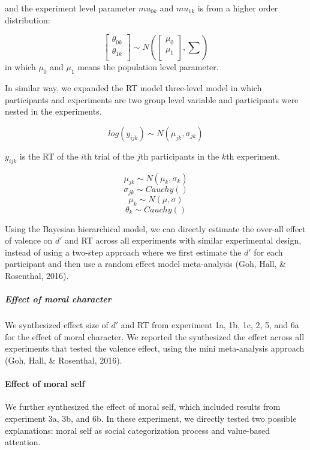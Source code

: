 \documentclass[
  english,
  man]{apa6}
\let\oldparagraph\paragraph
\renewcommand{\paragraph}[1]{\oldparagraph{#1}\mbox{}}
\let\oldsubparagraph\subparagraph
\renewcommand{\subparagraph}[1]{\oldsubparagraph{#1}\mbox{}}
\begin{document}
and the experiment level parameter \(mu_{0k}\) and \(mu_{1k}\) is from a higher order distribution:

\[\begin{bmatrix}\theta_{0k}\\
\theta_{1k}\\
\end{bmatrix} \sim N(\begin{bmatrix}\mu_{0}\\
\mu_{1}\\
\end{bmatrix}, \sum)\]
in which \(\mu_{0}\) and \(\mu_{1}\) means the population level parameter.

In similar way, we expanded the RT model three-level model in which participants and experiments are two group level variable and participants were nested in the experiments.

\[ log(y_{ijk}) \sim N(\mu_{jk}, \sigma_{jk})\]

\(y_{ijk}\) is the RT of the \(i\)th trial of the \(j\)th participants in the \(k\)th experiment.

\[\mu_{jk} \sim N(\mu_{k}, \sigma_{k})\]
\[\sigma_{jk} \sim Cauchy()\]
\[\mu_{k} \sim N(\mu, \sigma)\]
\[\theta_{k} \sim Cauchy()\]

Using the Bayesian hierarchical model, we can directly estimate the over-all effect of valence on \(d'\) and RT across all experiments with similar experimental design, instead of using a two-step approach where we first estimate the \(d'\) for each participant and then use a random effect model meta-analysis (Goh, Hall, \& Rosenthal, 2016).

\hypertarget{effect-of-moral-character}{%
\subparagraph{Effect of moral character}\label{effect-of-moral-character}}

We synthesized effect size of \(d'\) and RT from experiment 1a, 1b, 1c, 2, 5, and 6a for the effect of moral character. We reported the synthesized the effect across all experiments that tested the valence effect, using the mini meta-analysis approach (Goh, Hall, \& Rosenthal, 2016).

\hypertarget{effect-of-moral-self}{%
\paragraph{Effect of moral self}\label{effect-of-moral-self}}

We further synthesized the effect of moral self, which included results from experiment 3a, 3b, and 6b. In these experiment, we directly tested two possible explanations: moral self as social categorization process and value-based attention.
\end{document}
